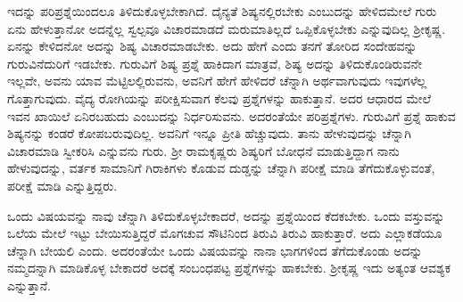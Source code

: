 ಇದನ್ನು ಪರಿಪ್ರಶ್ನೆಯಿಂದಲೂ ತಿಳಿದುಕೊಳ್ಳಬೇಕಾಗಿದೆ. ದೈನ್ಯತೆ ಶಿಷ್ಯನಲ್ಲಿರಬೇಕು ಎಂಬು\-ದನ್ನು ಹೇಳಿದಮೇಲೆ ಗುರು ಏನು ಹೇಳುತ್ತಾನೋ ಅದನ್ನೆಲ್ಲ ಸ್ವಲ್ಪವೂ ವಿಚಾರಮಾಡದೆ ಮರು\-ಮಾತಿಲ್ಲದೆ ಒಪ್ಪಿಕೊಳ್ಳಬೇಕು ಎನ್ನುವುದಿಲ್ಲ ಶ‍್ರೀಕೃಷ್ಣ. ಏನನ್ನು ಕೇಳಿದನೋ ಅದನ್ನು ಶಿಷ್ಯ ವಿಚಾರಮಾಡಬೇಕು. ಅದು ಹೇಗೆ ಎಂದು ತನಗೆ ತೋರಿದ ಸಂದೇಹವನ್ನು ಗುರುವಿನೆದುರಿಗೆ ಇಡಬೇಕು. ಗುರುವಿಗೆ ಶಿಷ್ಯ ಪ್ರಶ್ನೆ ಹಾಕಿದಾಗ ಮಾತ್ರವೆ, ಶಿಷ್ಯ ಅದನ್ನು ತಿಳಿದುಕೊಂಡಿರುವನೇ ಇಲ್ಲವೇ, ಅವನು ಯಾವ ಮೆಟ್ಟಿಲಲ್ಲಿರುವನು, ಅವನಿಗೆ ಹೇಗೆ ಹೇಳಿದರೆ ಚೆನ್ನಾಗಿ ಅರ್ಥವಾಗುವುದು ಇವುಗಳೆಲ್ಲ ಗೊತ್ತಾಗುವುದು. ವೈದ್ಯ ರೋಗಿಯನ್ನು ಪರೀಕ್ಷಿಸುವಾಗ ಕೆಲವು ಪ್ರಶ್ನೆಗಳನ್ನು ಹಾಕುತ್ತಾನೆ. ಅದರ ಆಧಾರದ ಮೇಲೆ ಇವನ ಖಾಯಿಲೆ ಏನಿರಬಹುದು ಎಂಬುದನ್ನು ನಿರ್ಧರಿಸುವನು. ಅದರಂತೆಯೇ ಪರಿಪ್ರಶ್ನೆಗಳು. ಗುರುವಿಗೆ ಪ್ರಶ್ನೆ ಹಾಕುವ ಶಿಷ್ಯನನ್ನು ಕಂಡರೆ ಕೋಪಬರುವುದಿಲ್ಲ. ಅವನಿಗೆ ಇನ್ನೂ ಪ್ರೀತಿ ಹೆಚ್ಚುವುದು. ತಾನು ಹೇಳುವುದನ್ನು ಚೆನ್ನಾಗಿ ವಿಚಾರಮಾಡಿ ಸ್ವೀಕರಿಸಿ ಎನ್ನುವನು ಗುರು. ಶ‍್ರೀ ರಾಮಕೃಷ್ಣರು ಶಿಷ್ಯರಿಗೆ ಬೋಧನೆ ಮಾಡುತ್ತಿದ್ದಾಗ ನಾನು ಹೇಳುವುದನ್ನು, ವರ್ತಕ ಸಾಮಾನಿಗೆ ಗಿರಾಕಿಗಳು ಕೊಡುವ ದುಡ್ಡನ್ನು ಚೆನ್ನಾಗಿ ಪರೀಕ್ಷೆ ಮಾಡಿ ತೆಗೆದುಕೊಳ್ಳುವಂತೆ, ಪರೀಕ್ಷೆ ಮಾಡಿ ಎನ್ನುತ್ತಿದ್ದರು.

ಒಂದು ವಿಷಯವನ್ನು ನಾವು ಚೆನ್ನಾಗಿ ತಿಳಿದುಕೊಳ್ಳಬೇಕಾದರೆ, ಅದನ್ನು ಪ್ರಶ್ನೆಯಿಂದ ಕೆದಕಬೇಕು. ಒಂದು ವಸ್ತುವನ್ನು ಒಲೆಯ ಮೇಲೆ ಇಟ್ಟು ಬೇಯಿಸುತ್ತಿದ್ದರೆ ಮೊಗಚುವ ಸೌಟಿನಿಂದ ತಿರುವಿ ತಿರುವಿ ಹಾಕುತ್ತಾರೆ. ಅದು ಎಲ್ಲಾಕಡೆಯೂ ಚೆನ್ನಾಗಿ ಬೇಯಲಿ ಎಂದು. ಅದರಂತೆಯೇ ಒಂದು ವಿಷಯವನ್ನು ನಾನಾ ಭಾಗಗಳಿಂದ ತೆಗೆದುಕೊಂಡು ಅದನ್ನು ನಮ್ಮದನ್ನಾಗಿ ಮಾಡಿಕೊಳ್ಳ ಬೇಕಾದರೆ ಅದಕ್ಕೆ ಸಂಬಂಧಪಟ್ಟ ಪ್ರಶ್ನೆಗಳನ್ನು ಹಾಕಬೇಕು. ಶ‍್ರೀಕೃಷ್ಣ ಇದು ಅತ್ಯಂತ ಆವಶ್ಯಕ ಎನ್ನುತ್ತಾನೆ.

